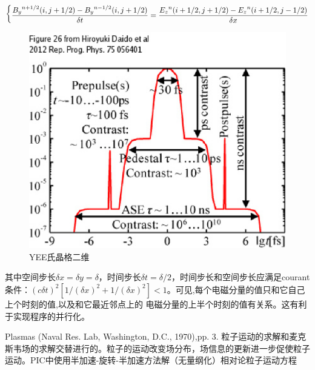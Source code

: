{\begin{equation}
\begin{dcases*}
\frac{ {B_y}^{n+1/2}(i,j+1/2)-{B_y}^{n-1/2}(i,j+1/2)}{\delta t} = \frac{ {E_z}^{n}(i+1/2,j+1/2)-{E_z}^{n}(i+1/2,j-1/2)}{\delta x}

\end{dcases*}
\end{equation} 


\begin{figure}[!htbp]
  \centering
  \includegraphics[width=\MyFactor\textwidth]{Img/prepulse2012.eps}
  \caption{YEE氏晶格二维}
  \label{fig:yee2d}
\end{figure}



其中空间步长$\delta x=\delta y=\delta$，时间步长$\delta t= \delta /2$，时间步长和空间步长应满足courant
条件：$(c \delta t)^2 [1/(\delta x)^2 + 1/(\delta x)^2] < 1$。可见,每个电磁分量的值只和它自己上个时刻的值,以及和它最近邻点上的
电磁分量的上半个时刻的值有关系。这有利于实现程序的并行化。



Plasmas (Naval Res. Lab, Washington, D.C., 1970),pp. 3.
粒子运动的求解和麦克斯韦场的求解交替进行的。粒子的运动改变场分布，场信息的更新进一步促使粒子运动。PIC中使用半加速-旋转-半加速方法解（无量纲化）相对论粒子运动方程
   
\begin{equation}
\label{eqn:PIC_motion}


\end{equation}}
